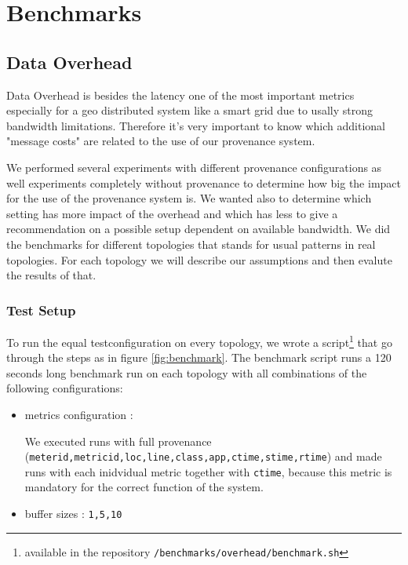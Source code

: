 \chapter{Benchmarks}
\section{Data Overhead}
Data Overhead is besides the latency one of the most important metrics especially for a geo distributed system like a smart grid due to usally strong bandwidth limitations. Therefore it's very important to know which additional "message costs" are related to the use of our provenance system.

We performed several experiments with different provenance configurations as well experiments completely without provenance to determine how big the impact for the use of the provenance system is. We wanted also to determine which setting has more impact of the overhead and which has less to give a recommendation on a possible setup dependent on available bandwidth.
We did the benchmarks for different topologies that stands for usual patterns in real topologies. For each topology we will describe our assumptions and then evalute the results of that.

\subsection{Test Setup}
To run the equal testconfiguration on every topology, we wrote a script\footnote{available in the repository \texttt{/benchmarks/overhead/benchmark.sh}} that go through the steps as in figure \ref{fig:benchmark}.
The benchmark script runs a 120 seconds long benchmark run on each topology with all combinations of the following configurations:


\begin{itemize}
\item metrics configuration :

We executed runs with full provenance (\texttt{meterid,metricid,loc,line,class,app,ctime,stime,rtime}) and made runs with each inidvidual metric together with \texttt{ctime}, because this metric is mandatory for the correct function of the system.

\item buffer sizes : \texttt{1,5,10}
\end{itemize}


